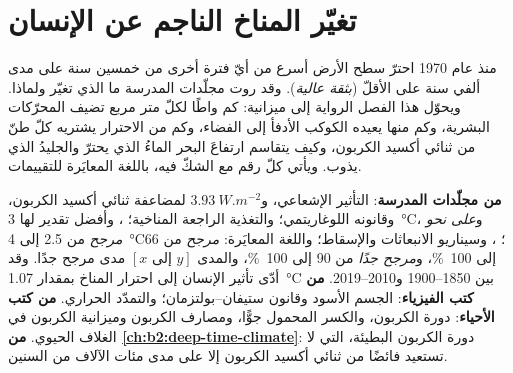 \chapter{تغيّر المناخ الناجم عن الإنسان}\label{ch:b2:anthropogenic-climate-change}

منذ عام 1970 احترّ سطح الأرض أسرع من أيّ فترة أخرى من خمسين سنة على مدى ألفي سنة على
الأقلّ (\emph{بثقة عالية}). وقد روت مجلّدات المدرسة ما الذي تغيّر
ولماذا. ويحوّل هذا الفصل الرواية إلى ميزانية: كم واطًا لكلّ متر مربع تضيف المحرّكات
البشرية، وكم منها يعيده الكوكب الأدفأ إلى الفضاء، وكم من الاحترار يشتريه كلّ طنّ من ثنائي أكسيد
الكربون، وكيف يتقاسم ارتفاعَ البحر الماءُ الذي يحترّ والجليدُ الذي يذوب. ويأتي كلّ رقم
مع الشكّ فيه، باللغة المعايَرة للتقييمات.

\begin{recall}
\textbf{من مجلّدات المدرسة}: التأثير الإشعاعي، و$\qty{3.93}{W.m^{-2}}$ لمضاعفة
ثنائي أكسيد الكربون، وقانونه اللوغاريتمي؛ والتغذية الراجعة المناخية؛ ، وأفضل
تقدير لها \qty{3}{\celsius}، و\emph{على نحو مرجح} من 2.5 إلى \qty{4}{\celsius}؛ ، وسيناريو الانبعاثات
والإسقاط؛ واللغة المعايَرة: \emph{مرجح} من 66 إلى \qty{100}{\percent}، و\emph{مرجح
جدًا} من 90 إلى \qty{100}{\percent}، والمدى $[x \text{ إلى } y]$ مدى مرجح جدًا. وقد
أدّى تأثير الإنسان إلى احترار المناخ بمقدار \qty{1.07}{\celsius} بين 1850--1900 و2010--2019.
\textbf{من كتب الفيزياء}: الجسم الأسود وقانون ستيفان--بولتزمان؛ والتمدّد الحراري.
\textbf{من كتب الأحياء}: دورة الكربون، والكسر المحمول جوًّا، ومصارف الكربون
وميزانية الكربون في الغلاف الحيوي. \textbf{من \cref{ch:b2:deep-time-climate}}: دورة الكربون البطيئة،
التي لا تستعيد فائضًا من ثنائي أكسيد الكربون إلا على مدى مئات الآلاف من السنين.
\end{recall}

